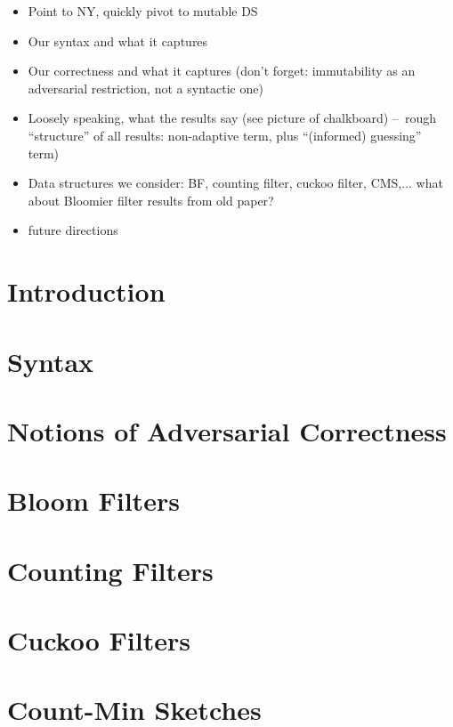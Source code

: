 \begin{itemize}
\item Point to NY, quickly pivot to mutable DS
\item Our syntax and what it captures
\item Our correctness and what it captures (don't forget: immutability as an
  adversarial restriction, not a syntactic one) 
\item Loosely speaking, what the results say (see picture of
  chalkboard) --~rough ``structure'' of all results: non-adaptive
  term, plus ``(informed) guessing'' term)
\item Data structures we consider: BF, counting filter, cuckoo filter,
  CMS,... what about Bloomier filter results from old paper?
\item future directions
\end{itemize}

\section{Introduction}


\section{Syntax}
\label{sec:syntax}


\section{Notions of Adversarial Correctness}
\label{sec:correctness}


\section{Bloom Filters}
\label{sec:bloom}


\section{Counting Filters}
\label{sec:counting}


\section{Cuckoo Filters}
\label{cuckoo}


\section{Count-Min Sketches}
\label{cms}



